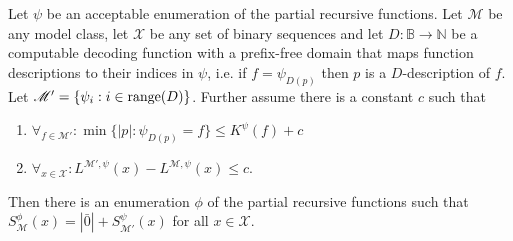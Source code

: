\documentclass{style/llncs}
\newcommand{\M}{\mathscr M}
\newcommand{\X}{\mathscr X}
\newcommand{\B}{\mathbb B}
\newcommand{\N}{\mathbb N}
\newcommand{\tn}[1]{\textnormal{#1}}
\begin{document}
\begin{lemma}\label{lemma:thecoolone}
  Let $\psi$ be an acceptable enumeration of the partial recursive functions.
  Let $\M$ be any model class, let $\X$ be any set of binary sequences and let $D:\B\to\N$ be a computable decoding function with a prefix-free domain that maps function descriptions to their indices in $\psi$, i.e. if $f=\psi_{D(p)}$ then $p$ is a $D$-description of $f$. Let $\M'=\{\psi_i:i\in\tn{range}(D)\}$. Further assume there is a constant $c$ such that
\begin{enumerate}
  \item $\forall_{f\in\M'}:\min\{|p|:\psi_{D(p)}=f\}\le K^\psi(f)+c$
  \item $\forall_{x\in\X}:L^{\M',\psi}(x)-L^{\M,\psi}(x)\le c$.
\end{enumerate}
Then there is an enumeration $\phi$ of the partial recursive functions such that $S^\phi_{\M}(x) = |\bar 0|+S^\psi_{\M'}(x)$ for all $x\in\X$.
\end{lemma}
\end{document}

